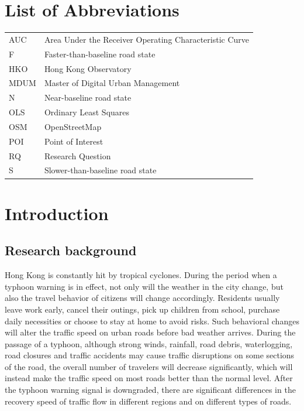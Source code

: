 \documentclass[12pt,a4paper]{report}
\begin{document}
\tableofcontents
\listoffigures
\listoftables

\chapter*{List of Abbreviations}
\begin{tabular}{ll}
AUC & Area Under the Receiver Operating Characteristic Curve \\
F & Faster-than-baseline road state \\
HKO & Hong Kong Observatory \\
MDUM & Master of Digital Urban Management \\
N & Near-baseline road state \\
OLS & Ordinary Least Squares \\
OSM & OpenStreetMap \\
POI & Point of Interest \\
RQ & Research Question \\
S & Slower-than-baseline road state \\
\end{tabular}

\clearpage
{}

\chapter{Introduction}

\section{Research background}
Hong Kong is constantly hit by tropical cyclones. During the period when a typhoon warning is in effect, not only will the weather in the city change, but also the travel behavior of citizens will change accordingly. Residents usually leave work early, cancel their outings, pick up children from school, purchase daily necessities or choose to stay at home to avoid risks. Such behavioral changes will alter the traffic speed on urban roads before bad weather arrives. During the passage of a typhoon, although strong winds, rainfall, road debris, waterlogging, road closures and traffic accidents may cause traffic disruptions on some sections of the road, the overall number of travelers will decrease significantly, which will instead make the traffic speed on most roads better than the normal level. After the typhoon warning signal is downgraded, there are significant differences in the recovery speed of traffic flow in different regions and on different types of roads.
\end{document}
